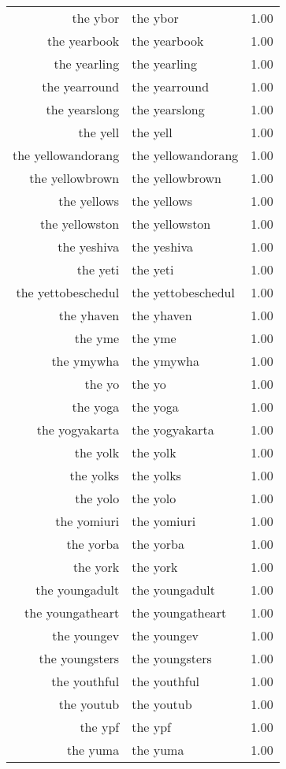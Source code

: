 \begin{table}[ht]
\begin{tabular}{rlr}
  the ybor & the ybor & 1.00 \\ 
  the yearbook & the yearbook & 1.00 \\ 
  the yearling & the yearling & 1.00 \\ 
  the yearround & the yearround & 1.00 \\ 
  the yearslong & the yearslong & 1.00 \\ 
  the yell & the yell & 1.00 \\ 
  the yellowandorang & the yellowandorang & 1.00 \\ 
  the yellowbrown & the yellowbrown & 1.00 \\ 
  the yellows & the yellows & 1.00 \\ 
  the yellowston & the yellowston & 1.00 \\ 
  the yeshiva & the yeshiva & 1.00 \\ 
  the yeti & the yeti & 1.00 \\ 
  the yettobeschedul & the yettobeschedul & 1.00 \\ 
  the yhaven & the yhaven & 1.00 \\ 
  the yme & the yme & 1.00 \\ 
  the ymywha & the ymywha & 1.00 \\ 
  the yo & the yo & 1.00 \\ 
  the yoga & the yoga & 1.00 \\ 
  the yogyakarta & the yogyakarta & 1.00 \\ 
  the yolk & the yolk & 1.00 \\ 
  the yolks & the yolks & 1.00 \\ 
  the yolo & the yolo & 1.00 \\ 
  the yomiuri & the yomiuri & 1.00 \\ 
  the yorba & the yorba & 1.00 \\ 
  the york & the york & 1.00 \\ 
  the youngadult & the youngadult & 1.00 \\ 
  the youngatheart & the youngatheart & 1.00 \\ 
  the youngev & the youngev & 1.00 \\ 
  the youngsters & the youngsters & 1.00 \\ 
  the youthful & the youthful & 1.00 \\ 
  the youtub & the youtub & 1.00 \\ 
  the ypf & the ypf & 1.00 \\ 
  the yuma & the yuma & 1.00 \\ 

\end{tabular}
\end{table}
